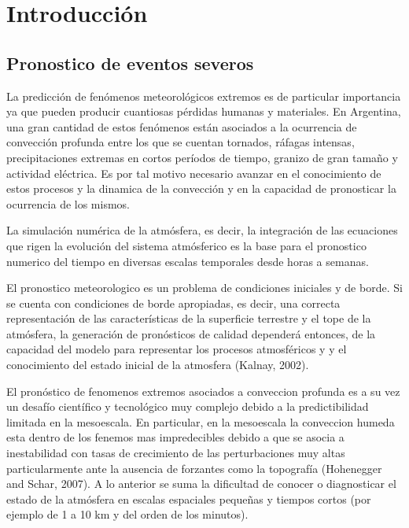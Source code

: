 \documentclass[12pt,oneside]{reedthesis}
\begin{document}
\hypertarget{introducciuxf3n}{%
\chapter{Introducción}\label{introducciuxf3n}}

\hypertarget{pronostico-de-eventos-severos}{%
\section{Pronostico de eventos severos}\label{pronostico-de-eventos-severos}}

La predicción de fenómenos meteorológicos extremos es de particular importancia ya que pueden producir cuantiosas pérdidas humanas y materiales. En Argentina, una gran cantidad de estos fenómenos están asociados a la ocurrencia de convección profunda entre los que se cuentan tornados, ráfagas intensas, precipitaciones extremas en cortos períodos de tiempo, granizo de gran tamaño y actividad eléctrica. Es por tal motivo necesario avanzar en el conocimiento de estos procesos y la dinamica de la convección y en la capacidad de pronosticar la ocurrencia de los mismos.

La simulación numérica de la atmósfera, es decir, la integración de las ecuaciones que rigen la evolución del sistema atmósferico es la base para el pronostico numerico del tiempo en diversas escalas temporales desde horas a semanas.

El pronostico meteorologico es un problema de condiciones iniciales y de borde. Si se cuenta con condiciones de borde apropiadas, es decir, una correcta representación de las características de la superficie terrestre y el tope de la atmósfera, la generación de pronósticos de calidad dependerá entonces, de la capacidad del modelo para representar los procesos atmosféricos y y el conocimiento del estado inicial de la atmosfera (Kalnay, 2002).

El pronóstico de fenomenos extremos asociados a conveccion profunda es a su vez un desafío científico y tecnológico muy complejo debido a la predictibilidad limitada en la mesoescala. En particular, en la mesoescala la conveccion humeda esta dentro de los fenemos mas impredecibles debido a que se asocia a inestabilidad con tasas de crecimiento de las perturbaciones muy altas particularmente ante la ausencia de forzantes como la topografía (Hohenegger and Schar, 2007). A lo anterior se suma la dificultad de conocer o diagnosticar el estado de la atmósfera en escalas espaciales pequeñas y tiempos cortos (por ejemplo de 1 a 10 km y del orden de los minutos).
\end{document}
